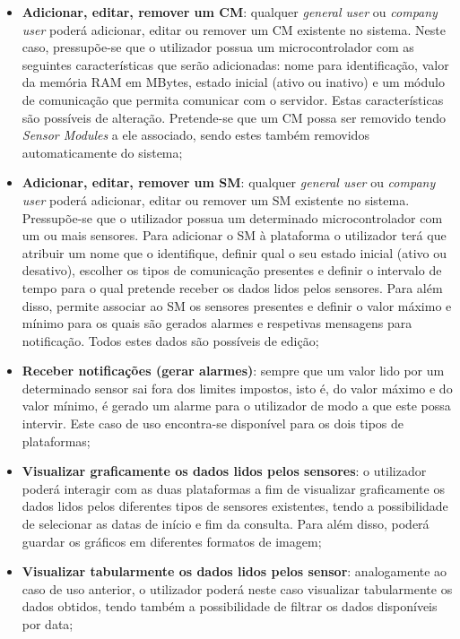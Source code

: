 \begin{itemize}
	
	\item \textbf{Adicionar, editar, remover um \acl{CM}}: qualquer \textit{general user} ou \textit{company user} poderá adicionar, editar ou remover um \acl{CM} existente no sistema. Neste caso, pressupõe-se que o utilizador possua um microcontrolador com as seguintes características que serão  adicionadas: nome para identificação, valor da memória \ac{RAM} em MBytes, estado inicial (ativo ou inativo) e um módulo de comunicação que permita comunicar com o servidor. Estas características são possíveis de  alteração. Pretende-se que um \acl{CM} possa ser removido tendo \textit{Sensor Modules} a ele associado, sendo estes também removidos automaticamente do sistema;


	\item \textbf{Adicionar, editar, remover um \acl{SM}}: qualquer \textit{general user} ou \textit{company user} poderá adicionar, editar ou remover um \acl{SM} existente no sistema. Pressupõe-se que o utilizador possua um determinado microcontrolador com um ou mais sensores. Para adicionar o \acl{SM} à plataforma o utilizador terá que atribuir um nome que o identifique, definir qual o seu estado inicial (ativo ou desativo), escolher os tipos de comunicação presentes e definir o intervalo de tempo para o qual pretende receber os dados lidos pelos sensores. Para além disso, permite associar ao \acl{SM} os sensores presentes e definir o valor máximo e mínimo para os quais são gerados alarmes e respetivas mensagens para notificação. Todos estes dados são possíveis de edição; 
	

	
	\item \textbf{Receber notificações (gerar alarmes)}: sempre que um valor lido por um determinado sensor sai fora dos limites impostos, isto é, do valor máximo e do valor mínimo, é gerado um alarme para o utilizador de modo a que este possa intervir. Este caso de uso encontra-se disponível para os dois tipos de plataformas;
	
	
	\item \textbf{Visualizar graficamente os dados lidos pelos sensores}: o utilizador poderá interagir com as duas plataformas a fim de visualizar graficamente os dados lidos pelos diferentes tipos de sensores existentes, tendo a possibilidade de selecionar as datas de início e fim da consulta. Para além disso, poderá guardar os gráficos em diferentes formatos de imagem;
	
	\item \textbf{Visualizar tabularmente os dados lidos pelos sensor}: analogamente ao caso de uso anterior, o utilizador poderá neste caso visualizar tabularmente os dados obtidos, tendo também a possibilidade de filtrar os dados disponíveis por data; 
	

\end{itemize}
